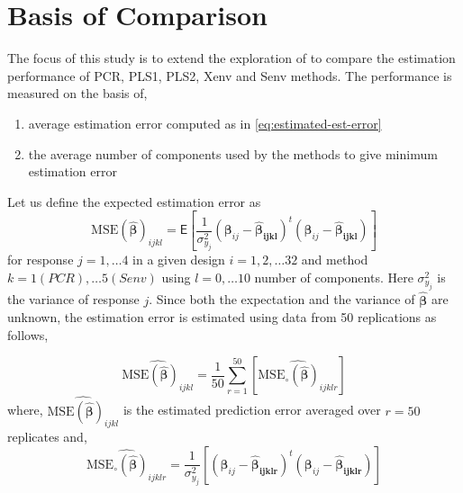 \documentclass[12pt,3p,authoryear]{elsarticle}
\providecommand{\tightlist}{%
  \setlength{\itemsep}{0pt}\setlength{\parskip}{0pt}}
\begin{document}
\hypertarget{basis-of-comparison}{%
\section{Basis of Comparison}\label{basis-of-comparison}}

The focus of this study is to extend the exploration of \citet{rimal2019pred} to compare the estimation performance of PCR, PLS1, PLS2, Xenv and Senv methods. The performance is measured on the basis of,

\begin{enumerate}
\def\labelenumi{\alph{enumi})}
\tightlist
\item
  average estimation error computed as in \eqref{eq:estimated-est-error}
\item
  the average number of components used by the methods to give minimum estimation error
\end{enumerate}

Let us define the expected estimation error as
\begin{equation}
  \text{MSE}\left(
    \widehat{\boldsymbol{\beta}}
  \right)_{ijkl} =
  \mathsf{E}{\left[
    \frac{1}{\sigma_{y_j}^2}\left(
      \boldsymbol{\beta}_{ij} - \boldsymbol{\widehat{\beta}_{ijkl}}
    \right)^t
    \left(
      \boldsymbol{\beta}_{ij} - \boldsymbol{\widehat{\beta}_{ijkl}}
    \right)
  \right]}
\label{eq:est-error}
\end{equation}
for response \(j = 1, \ldots 4\) in a given design \(i=1, 2, \ldots 32\) and method \(k=1(PCR), \ldots 5(Senv)\) using \(l=0, \ldots 10\) number of components. Here \(\sigma_{y_j}^2\) is the variance of response \(j\). Since both the expectation and the variance of \(\widehat{\boldsymbol{\beta}}\) are unknown, the estimation error is estimated using data from 50 replications as follows,

\begin{equation}
\widehat{\text{MSE}\left(\widehat{\boldsymbol{\beta}}\right)_{ijkl}} =
  \frac{1}{50}\sum_{r=1}^{50}{\left[
    \widehat{\text{MSE}_\circ\left(\widehat{\boldsymbol{\beta}}\right)_{ijklr}}  
  \right]}
\label{eq:estimated-est-error}
\end{equation}
where, \(\widehat{\text{MSE}\left(\widehat{\boldsymbol{\beta}}\right)_{ijkl}}\) is the estimated prediction error averaged over \(r=50\) replicates and,
\[\widehat{\text{MSE}_\circ\left(\boldsymbol{\widehat{\beta}}\right)_{ijklr}} = 
  \frac{1}{\sigma_{y_j}^2}\left[\left(\boldsymbol{\beta}_{ij} -\boldsymbol{\widehat{\beta}_{ijklr}}\right)^t\left(\boldsymbol{\beta}_{ij} - \boldsymbol{\widehat{\beta}_{ijklr}}\right)
\right]\]
\end{document}
